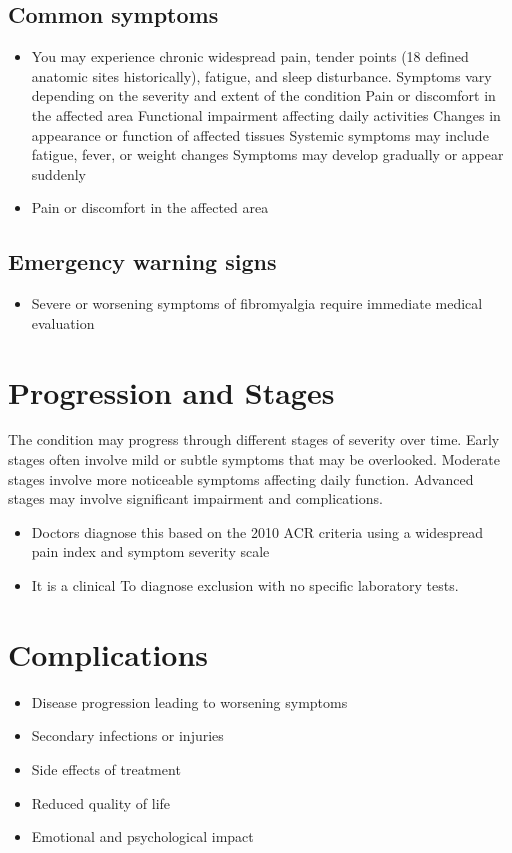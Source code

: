 \subsection{Common symptoms}
\begin{itemize}[noitemsep]
  \item You may experience chronic widespread pain, tender points (18 defined anatomic sites historically), fatigue, and sleep disturbance. Symptoms vary depending on the severity and extent of the condition Pain or discomfort in the affected area Functional impairment affecting daily activities Changes in appearance or function of affected tissues Systemic symptoms may include fatigue, fever, or weight changes Symptoms may develop gradually or appear suddenly
  \item Pain or discomfort in the affected area
  \end{itemize}

\subsection{Emergency warning signs}
\begin{itemize}[noitemsep]
  \item Severe or worsening symptoms of fibromyalgia require immediate medical evaluation
\end{itemize}
\section{Progression and Stages}
The condition may progress through different stages of severity over time. Early stages often involve mild or subtle symptoms that may be overlooked. Moderate stages involve more noticeable symptoms affecting daily function. Advanced stages may involve significant impairment and complications.

\begin{itemize}[noitemsep]
  \item Doctors diagnose this based on the 2010 ACR criteria using a widespread pain index and symptom severity scale
  \item It is a clinical To diagnose exclusion with no specific laboratory tests.
\end{itemize}
\section{Complications}
\begin{itemize}[noitemsep]
  \item Disease progression leading to worsening symptoms
  \item Secondary infections or injuries
  \item Side effects of treatment
  \item Reduced quality of life
  \item Emotional and psychological impact
\end{itemize}

